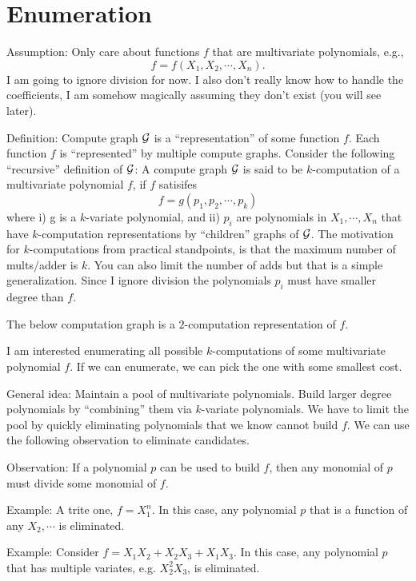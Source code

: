 \documentclass[12pt]{article}
\begin{document}
\maketitle



\section{Enumeration}

Assumption: Only care about functions $f$ that are multivariate polynomials,
e.g., 
\[
    f = f(X_1, X_2, \cdots, X_n).
\]
I am going to ignore division for now. 
I also don't really know how to handle the coefficients, I am somehow magically
assuming they don't exist (you will see later).

Definition: Compute graph $\mathcal{G}$ is a ``representation'' of some function $f$.
Each function $f$ is ``represented'' by multiple compute graphs.
Consider the following ``recursive'' definition of $\mathcal{G}$:
A compute graph $\mathcal{G}$ is said to be $k$-computation of a multivariate
polynomial $f$, if $f$ satisifes
\[
    f = g(p_1, p_2, \cdots, p_k)
\]
where 
i) g is a $k$-variate polynomial, and 
ii) $p_i$ are polynomials in $X_1, \cdots, X_n$ that have $k$-computation
representations by ``children'' graphs of $\mathcal{G}$. 
The motivation for $k$-computations from practical standpoints, is that the
maximum number of mults/adder is $k$. 
You can also limit the number of adds but that is a simple generalization.
Since I ignore division the polynomials $p_i$ must have smaller degree than $f$.

The below computation graph is a $2$-computation representation of $f$.

I am interested enumerating all possible $k$-computations of some multivariate
polynomial $f$.
If we can enumerate, we can pick the one with some smallest cost.

General idea: Maintain a pool of multivariate polynomials. 
Build larger degree polynomials by ``combining'' them via $k$-variate polynomials.  
We have to limit the pool by quickly eliminating polynomials that we know cannot
build $f$. 
We can use the following observation to eliminate candidates.

Observation: If a polynomial $p$ can be used to build $f$, then any monomial of
$p$ must divide some monomial of $f$. 

Example: A trite one, $f = X_1^n$. In this case, any polynomial $p$ that is a
function of any $X_2, \cdots$ is eliminated.

Example: Consider $f = X_1 X_2 + X_2 X_3 + X_1 X_3$. In this case, any
polynomial $p$ that has multiple variates, e.g. $X_2^2 X_3$, is eliminated.
\end{document}

